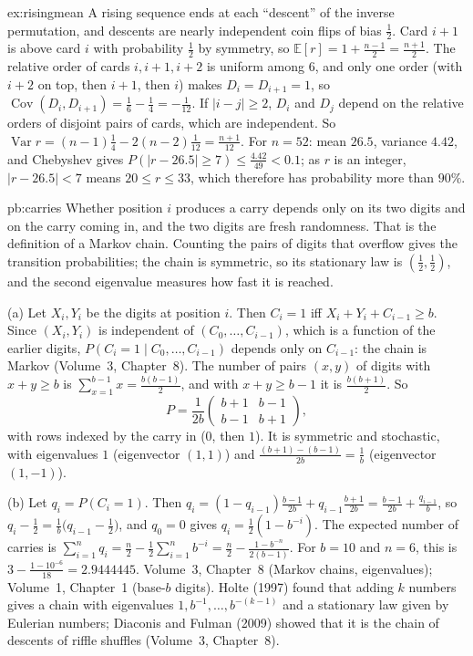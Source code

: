 \begin{solution}{ex:risingmean}
\idea A rising sequence ends at each ``descent'' of the inverse permutation, and descents are nearly independent coin flips
of bias $\frac12$.
\writeup Card $i+1$ is above card $i$ with probability $\frac12$ by symmetry, so $\mathbb E[r]=1+\frac{n-1}2=\frac{n+1}2$. The relative order of cards $i,i+1,i+2$ is uniform among
$6$, and only one order (with $i+2$ on top, then $i+1$, then $i$) makes $D_i=D_{i+1}=1$, so $\operatorname{Cov}(D_i,D_{i+1})=\frac16-\frac14=-\frac1{12}$. If $|i-j|\ge2$, $D_i$ and $D_j$ depend on the
relative orders of disjoint pairs of cards, which are independent. So $\operatorname{Var}r=(n-1)\frac14-2(n-2)\frac1{12}=\frac{n+1}{12}$. For $n=52$: mean $26.5$, variance $4.42$, and
Chebyshev gives $P(|r-26.5|\ge7)\le\frac{4.42}{49}<0.1$; as $r$ is an integer, $|r-26.5|<7$ means $20\le r\le33$, which therefore has probability more than $90\%$.
\end{solution}

\begin{solution}{pb:carries}
\idea Whether position $i$ produces a carry depends only on its two digits and on the carry coming in, and the two digits
are fresh randomness. That is the definition of a Markov chain. Counting the pairs of digits that overflow gives the
transition probabilities; the chain is symmetric, so its stationary law is $(\frac12,\frac12)$, and the second eigenvalue
measures how fast it is reached.

\writeup (a) Let $X_i,Y_i$ be the digits at position $i$. Then $C_i=1$ iff $X_i+Y_i+C_{i-1}\ge b$. Since $(X_i,Y_i)$ is
independent of $(C_0,\dots,C_{i-1})$, which is a function of the earlier digits, $P(C_i=1\mid C_0,\dots,C_{i-1})$ depends only
on $C_{i-1}$: the chain is Markov (Volume~3, Chapter~8). The number of pairs $(x,y)$ of digits with $x+y\ge b$ is
$\sum_{x=1}^{b-1}x=\frac{b(b-1)}2$, and with $x+y\ge b-1$ it is $\frac{b(b+1)}2$. So
\[
P=\frac1{2b}\begin{pmatrix}b+1&b-1\\b-1&b+1\end{pmatrix},
\]
with rows indexed by the carry in ($0$, then $1$). It is symmetric and stochastic, with eigenvalues $1$ (eigenvector
$(1,1)$) and $\frac{(b+1)-(b-1)}{2b}=\frac1b$ (eigenvector $(1,-1)$).

(b) Let $q_i=P(C_i=1)$. Then $q_i=(1-q_{i-1})\frac{b-1}{2b}+q_{i-1}\frac{b+1}{2b}=\frac{b-1}{2b}+\frac{q_{i-1}}b$, so
$q_i-\frac12=\frac1b\bigl(q_{i-1}-\frac12\bigr)$, and $q_0=0$ gives $q_i=\frac12(1-b^{-i})$. The expected number of carries
is $\sum_{i=1}^nq_i=\frac n2-\frac12\sum_{i=1}^nb^{-i}=\frac n2-\frac{1-b^{-n}}{2(b-1)}$. For $b=10$ and $n=6$, this is
$3-\frac{1-10^{-6}}{18}=2.9444445$.
\tools Volume~3, Chapter~8 (Markov chains, eigenvalues); Volume~1, Chapter~1 (base-$b$ digits).
\leads Holte (1997) found that adding $k$ numbers gives a chain with eigenvalues $1,b^{-1},\dots,b^{-(k-1)}$ and a stationary law
given by Eulerian numbers; Diaconis and Fulman (2009) showed that it is the chain of descents of riffle shuffles
(Volume~3, Chapter~8).
\end{solution}


